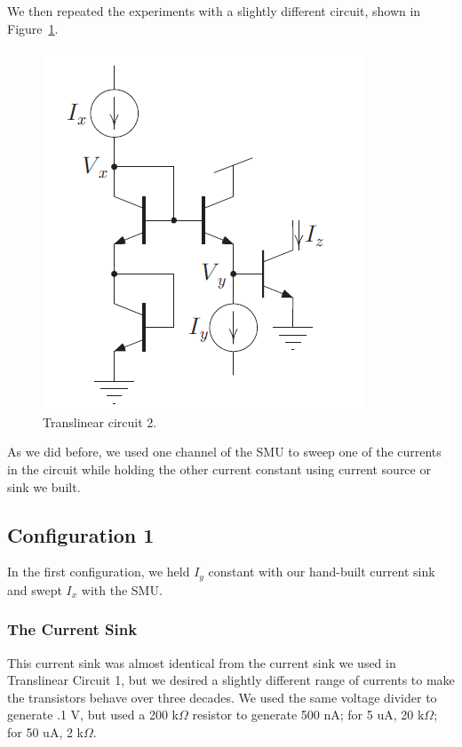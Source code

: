\documentclass{article}
\begin{document}
We then repeated the experiments with a slightly different circuit, shown in Figure~\ref{fig:tl2}.


\begin{figure}[H]
\begin{center}
\includegraphics[scale=.5]{tl2.png}
\caption{Translinear circuit 2.}
\label{fig:tl2}
\end{center}
\end{figure}

As we did before, we used one channel of the SMU to sweep one of the currents in the circuit while holding the other current constant using current source or sink we built.

\subsection*{Configuration 1}

In the first configuration, we held $I_y$ constant with our hand-built current sink and swept $I_x$ with the SMU.  

\subsubsection*{The Current Sink}

This current sink was almost identical from the current sink we used in Translinear Circuit 1, but we desired a slightly different range of currents to make the transistors behave over three decades.  We used the same voltage divider to generate .1 V, but used a 200 k$\Omega$ resistor to generate 500 nA; for 5 uA, 20 k$\Omega$; for 50 uA, 2 k$\Omega$.
\end{document}
